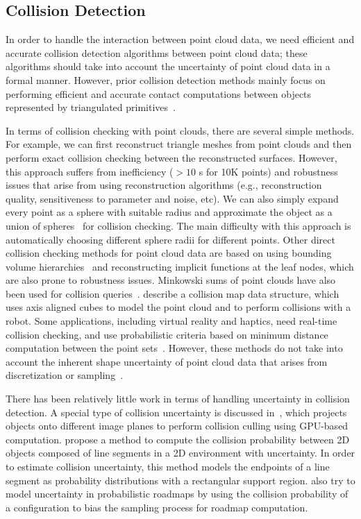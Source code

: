 \subsection{Collision Detection}
In order to handle the interaction between point cloud data, we need efficient and accurate collision detection algorithms between point cloud data; these algorithms should take into account the uncertainty of point cloud data in a formal manner.
However, prior collision detection methods mainly focus on performing efficient and accurate contact computations between objects represented by triangulated primitives~\cite{LM03}.

In terms of collision checking with point clouds, there are several simple methods. For example,
we can first reconstruct triangle meshes from point clouds and then perform exact collision checking between the reconstructed surfaces.
However, this approach suffers from inefficiency ($>10$ s for 10K points) and robustness issues that arise from using reconstruction algorithms (e.g., reconstruction quality, sensitiveness to parameter and noise, etc). We can also simply expand every point as a sphere with suitable radius and approximate the object as a union of spheres~\cite{Hubbard:1996} for collision checking. The main difficulty with this approach is automatically choosing different sphere radii for different points. Other direct collision checking methods for point cloud data are based on using bounding volume hierarchies~\cite{Jan:2004,Sternemann:2007} and reconstructing implicit functions at the leaf nodes, which are also prone to robustness issues. Minkowski sums of point clouds have also been used for collision queries~\cite{Lien:2007}. \cite{Ioan:2010} describe a collision map data structure, which uses axis aligned cubes to model the point cloud and to perform collisions with a robot.
Some applications, including virtual reality and haptics, need real-time collision checking, and use probabilistic criteria based on minimum distance computation between the point sets~\cite{Lee:haptics:2007}. However, these methods do not take into account the inherent shape uncertainty of point cloud data that arises from discretization or sampling~\cite{Pauly:2004}.

There has been relatively little work in terms of handling uncertainty in collision detection. A special type of collision uncertainty is discussed in~\cite{Govindaraju:2006:VRST}, which projects objects onto different image planes to perform collision culling using GPU-based computation. \cite{Guibas:wafr2009} propose a method to compute the collision probability between 2D objects composed of line segments in a 2D environment with uncertainty. In order to estimate collision uncertainty, this method models the endpoints of a line segment as probability distributions with a rectangular support region. \cite{Missiuro:2006} also try to model uncertainty in probabilistic roadmaps by using the collision probability of a configuration to bias the sampling process for roadmap computation.


